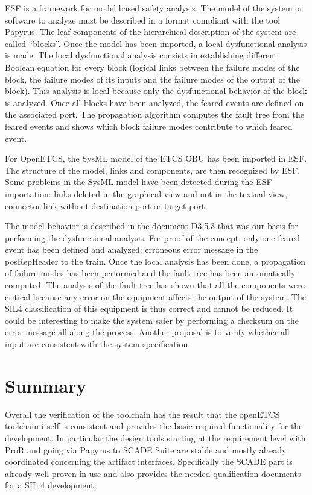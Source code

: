 \documentclass{template/openetcs_report}
\begin{document}
ESF is a framework for model based safety analysis. The model of the system or software to analyze must be described in a format compliant with the tool Papyrus. The leaf components of the hierarchical description of the system are called “blocks”. Once the model has been imported, a local dysfunctional analysis is made. The local dysfunctional analysis consists in establishing different Boolean equation for every block (logical links between the failure modes of the block, the failure modes of its inputs and the failure modes of the output of the block). This analysis is local because only the dysfunctional behavior of the block is analyzed. Once all blocks have been analyzed, the feared events are defined on the associated port. The propagation algorithm computes the fault tree from the feared events and shows which block failure modes contribute to which feared event.

For OpenETCS, the SysML model of the ETCS OBU has been imported in ESF. The structure of the model, links and components, are then recognized by ESF. Some problems in the SysML model have been detected during the ESF importation: links deleted in the graphical view and not in the textual view, connector link without destination port or target port.

The model behavior is described in the document D3.5.3 that was our basis for performing the dysfunctional analysis. For proof of the concept, only one feared event has been defined and analyzed: erroneous error message in the posRepHeader to the train. Once the local analysis has been done, a propagation of failure modes has been performed and the fault tree has been automatically computed. 
The analysis of the fault tree has shown that all the components were critical because any error on the equipment affects the output of the system. The SIL4 classification of this equipment is thus correct and cannot be reduced. It could be interesting to make the system safer by performing a checksum on the error message all along the process. Another proposal is to verify whether all input are consistent with the system specification.

\section{Summary}
\label{summary-tool}

Overall the verification of the toolchain has the result that the openETCS toolchain itself is consistent and provides the basic required functionality for the development. In particular the design tools starting at the requirement level with ProR and going via Papyrus to SCADE Suite are stable and mostly already coordinated concerning the artifact interfaces. Specifically the SCADE part is already well proven in use and also provides the needed qualification documents for a SIL 4 development. 
\end{document}

